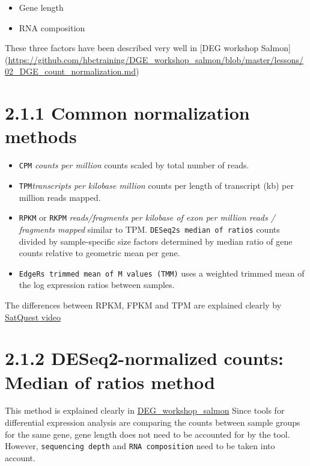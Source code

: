 \documentclass[
]{article}
\begin{document}
\begin{itemize}
\item
  Gene length
\item
  RNA composition
\end{itemize}

These three factors have been described very well in {[}DEG workshop
Salmon{]}
(\url{https://github.com/hbctraining/DGE_workshop_salmon/blob/master/lessons/02_DGE_count_normalization.md})

\section{2.1.1 Common normalization
methods}\label{common-normalization-methods}

\begin{itemize}
\item
  \texttt{CPM} \emph{counts per million} counts scaled by total number
  of reads.
\item
  \texttt{TPM}\emph{transcripts per kilobase million} counts per length
  of transcript (kb) per million reads mapped.
\item
  \texttt{RPKM} or \texttt{RKPM} \emph{reads/fragments per kilobase of
  exon per million reads / fragments mapped} similar to TPM.
  \texttt{DESeq2\textquotesingle{}s\ median\ of\ ratios} counts divided
  by sample-specific size factors determined by median ratio of gene
  counts relative to geometric mean per gene.
\item
  \texttt{EdgeR\textquotesingle{}s\ trimmed\ mean\ of\ M\ values\ (TMM)}
  uses a weighted trimmed mean of the log expression ratios between
  samples.
\end{itemize}

The differences between RPKM, FPKM and TPM are explained clearly by
\href{https://www.rna-seqblog.com/rpkm-fpkm-and-tpm-clearly-explained/}{SatQuest
video}

\section{2.1.2 DESeq2-normalized counts: Median of ratios
method}\label{deseq2-normalized-counts-median-of-ratios-method}

This method is explained clearly in
\href{https://github.com/hbctraining/DGE_workshop_salmon/blob/master/lessons/02_DGE_count_normalization.md}{DEG\_workshop\_salmon}
Since tools for differential expression analysis are comparing the
counts between sample groups for the same gene, gene length does not
need to be accounted for by the tool. However,
\texttt{sequencing\ depth} and \texttt{RNA\ composition} need to be
taken into account.
\end{document}
